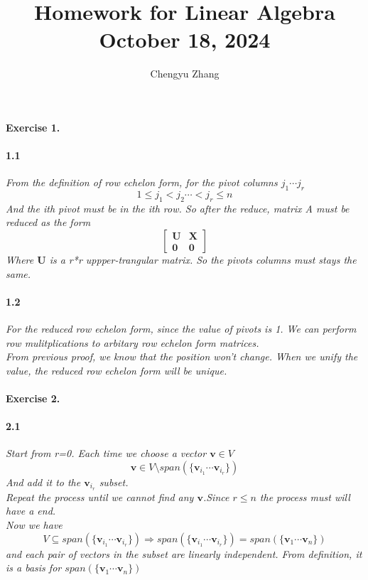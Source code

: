 \documentclass{article}
\title{\vspace*{-3.5cm}Homework for Linear Algebra \\October 18, 2024}
\author{Chengyu Zhang}
\date{}
\begin{document}
\maketitle

\paragraph{Exercise 1.}
  \paragraph{1.1}
  \textit{
    From the definition of row echelon form, for the pivot columns $j_1 \cdots j_r$ 
    \[
    1 \leq j_1 < j_2 \cdots < j_r \leq n
    \]
    And the ith pivot must be in the ith row.
    So after the reduce, matrix A must be reduced as the form 
    \[
    \begin{bmatrix}
        \mathbf{U} & \mathbf{X}\\
        \mathbf{0} & \mathbf{0}
    \end{bmatrix}
    \]
    Where $\mathbf{U}$ is a r*r uppper-trangular matrix. So the pivots columns must stays the same.
  }
  \paragraph{1.2}
  \textit{
    For the reduced row echelon form, since the value of pivots is 1. We can perform row mulitplications to arbitary row echelon form matrices.\\
    From previous proof, we know that the position won't change. When we unify the value, the reduced row echelon form will be unique.
  }

\paragraph{Exercise 2.}
  \paragraph{2.1}
  \textit{
     Start from r=0. Each time we choose a vector $\mathbf{v} \in V$
     \[
     \mathbf{v} \in V \setminus span(\{\mathbf{v}_{i_1}\cdots \mathbf{v}_{i_r}\})
     \]
     And add it to the $\mathbf{v}_{i_r}$ subset.\\
     Repeat the process until we cannot find any $\mathbf{v}$.Since $ r \leq n$ the process must will have a end.\\
     Now we have \[
        V \subseteq span(\{\mathbf{v}_{i_1}\cdots \mathbf{v}_{i_r}\}) \Rightarrow  span(\{\mathbf{v}_{i_1}\cdots \mathbf{v}_{i_r}\}) =span(\{\mathbf{v}_{1}\cdots \mathbf{v}_{n}\})
     \]
     and each pair of vectors in the subset are linearly independent.
     From definition, it is a basis for $span(\{\mathbf{v}_{1}\cdots \mathbf{v}_{n}\})$
  }
\end{document}
